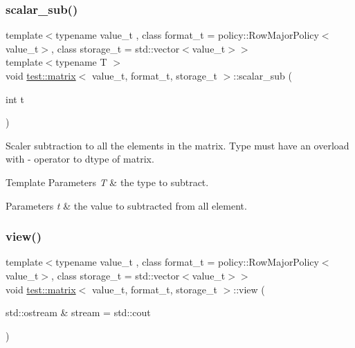 \subsubsection{\texorpdfstring{scalar\_sub()}{scalar\_sub()}}
{\footnotesize\ttfamily template$<$typename value\+\_\+t , class format\+\_\+t  = policy\+::\+Row\+Major\+Policy$<$value\+\_\+t$>$, class storage\+\_\+t  = std\+::vector$<$value\+\_\+t$>$$>$ \\
template$<$typename T $>$ \\
void \mbox{\hyperlink{classtest_1_1matrix}{test\+::matrix}}$<$ value\+\_\+t, format\+\_\+t, storage\+\_\+t $>$\+::scalar\+\_\+sub (\begin{DoxyParamCaption}\item[{int}]{t }\end{DoxyParamCaption})\hspace{0.3cm}{\ttfamily [inline]}}



Scaler subtraction to all the elements in the matrix. Type must have an overload with -\/ operator to dtype of matrix. 


\begin{DoxyTemplParams}{Template Parameters}
{\em T} & the type to subtract. \\
\hline
\end{DoxyTemplParams}

\begin{DoxyParams}{Parameters}
{\em t} & the value to subtracted from all element. \\
\hline
\end{DoxyParams}
\mbox{\label{classtest_1_1matrix_a854639ce240ca81c977aa7a1cc4be932}} 
\subsubsection{\texorpdfstring{view()}{view()}}
{\footnotesize\ttfamily template$<$typename value\+\_\+t , class format\+\_\+t  = policy\+::\+Row\+Major\+Policy$<$value\+\_\+t$>$, class storage\+\_\+t  = std\+::vector$<$value\+\_\+t$>$$>$ \\
void \mbox{\hyperlink{classtest_1_1matrix}{test\+::matrix}}$<$ value\+\_\+t, format\+\_\+t, storage\+\_\+t $>$\+::view (\begin{DoxyParamCaption}\item[{std\+::ostream \&}]{stream = {\ttfamily std\+:\+:cout} }\end{DoxyParamCaption})\hspace{0.3cm}{\ttfamily [inline]}}



